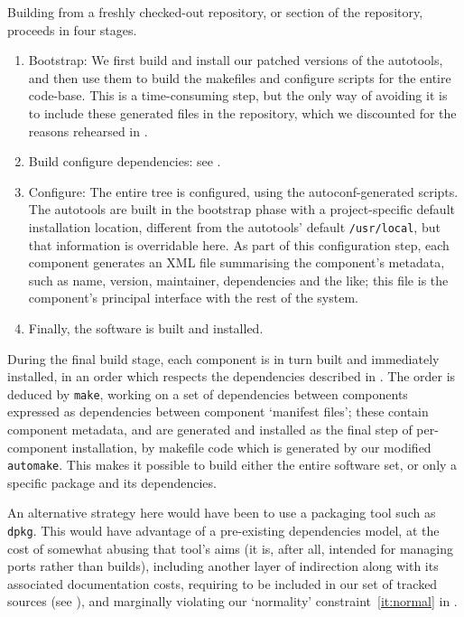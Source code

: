 \documentclass{speauth}
\begin{document}
Building from a freshly checked-out repository, or section of the
repository, proceeds in four stages.
\begin{enumerate}
\item Bootstrap: We first build and install our patched versions of
  the autotools, and then use them to build the makefiles and
  configure scripts for the entire code-base.  This is a
  time-consuming step, but the only way of avoiding it is to include
  these generated files in the repository, which we discounted for the
  reasons rehearsed in .

\item \label{it:configuredeps} Build configure dependencies: see
  .

\item Configure: The entire tree is configured, using the
  autoconf-generated scripts.  The autotools are built in the
  bootstrap phase with a project-specific default installation
  location, different from the autotools' default \texttt{/usr/local},
  but that information is overridable here.  As part of this
  configuration step, each component generates an XML file summarising
  the component's metadata, such as name, version, maintainer,
  dependencies and the like; this file is the component's principal
  interface with the rest of the system.

\item Finally, the software is built and installed.
\end{enumerate}

During the final build stage, each component is in turn built and
immediately installed, in an order which respects the dependencies
described in .  The order is deduced by
\texttt{make}, working on a set of dependencies between components
expressed as dependencies between component `manifest files'; these
contain component metadata, and are generated and installed as the
final step of per-component installation, by makefile code which is
generated by our modified \texttt{automake}.  This makes it possible
to build either the entire software set, or only a specific package
and its dependencies.

An alternative strategy here would have been to use a packaging tool
such as \texttt{dpkg}.  This would have advantage of a pre-existing
dependencies model, at the cost of somewhat abusing that tool's aims
(it is, after all, intended for managing ports rather than builds),
including another layer of indirection along with its associated
documentation costs, requiring to be included in our set of tracked
sources (see ), and marginally violating our
`normality' constraint~\ref{it:normal} in .
\end{document}
